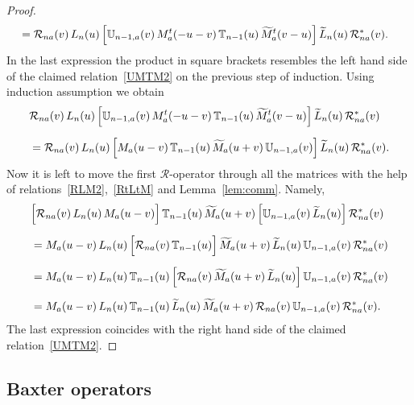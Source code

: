 \documentclass[11pt]{article}
\numberwithin{equation}{section}
\theoremstyle{plain}
\theoremstyle{definition}
\newcommand{\T}{\mathbb{T}}
\newcommand{\MMO}{\mathbb{U}}
\begin{document}
\begin{proof}
\begin{align}
\begin{aligned}
			& = \mathcal{R}_{na}(v) \,  L_n(u) \, \Bigl[ \MMO_{n - 1 , a}(v) \, M_a^t(- u - v) \, \T_{n - 1}(u) \, \widetilde{M}^t_a(v - u) \Bigr]  \, \widetilde{L}_n(u) \,  \mathcal{R}^*_{na}(v).
		\end{aligned}
	\end{align}
	In the last expression the product in square brackets resembles the left hand side of the claimed relation~\eqref{UMTM2} on the previous step of induction. Using induction assumption we obtain
	\begin{align}
		\begin{aligned}
			& \mathcal{R}_{na}(v) \,  L_n(u) \, \Bigl[ \MMO_{n - 1 , a}(v) \, M_a^t(- u - v) \, \T_{n - 1}(u) \, \widetilde{M}^t_a(v - u) \Bigr]  \, \widetilde{L}_n(u) \,  \mathcal{R}^*_{na}(v) \\[6pt]
			& = \mathcal{R}_{na}(v) \,  L_n(u) \, \Bigl[ M_a(u - v) \, \T_{n - 1}(u) \, \widetilde{M}_a(u + v) \, \MMO_{n - 1 , a}(v)  \Bigr]  \, \widetilde{L}_n(u) \,  \mathcal{R}^*_{na}(v).
		\end{aligned}
	\end{align}
	Now it is left to move the first $\mathcal{R}$-operator through all the matrices with the help of relations~\eqref{RLM2},~\eqref{RtLtM} and Lemma~\ref{lem:comm}. Namely,
	\begin{align}
		\begin{aligned}
			& \Bigl[ \mathcal{R}_{na}(v) \,  L_n(u) \, M_a(u - v)  \Bigr] \, \T_{n - 1}(u) \, \widetilde{M}_a(u + v) \, \Bigr[ \MMO_{n - 1 , a}(v)   \, \widetilde{L}_n(u)  \Bigr] \,  \mathcal{R}^*_{na}(v) \\[6pt]
			& = M_a(u - v)  \,  L_n(u) \, \Bigl[ \mathcal{R}_{na}(v) \, \T_{n - 1}(u) \Bigr] \, \widetilde{M}_a(u + v)  \, \widetilde{L}_n(u) \,  \MMO_{n - 1 , a}(v)   \,  \mathcal{R}^*_{na}(v) \\[6pt]
			& = M_a(u - v)  \,  L_n(u) \,  \T_{n - 1}(u) \, \Bigl[ \mathcal{R}_{na}(v) \, \widetilde{M}_a(u + v)  \, \widetilde{L}_n(u) \Bigr] \,  \MMO_{n - 1 , a}(v)   \,  \mathcal{R}^*_{na}(v) \\[6pt]
			& = M_a(u - v)  \,  L_n(u) \,  \T_{n - 1}(u) \, \widetilde{L}_n(u) \,  \widetilde{M}_a(u + v)  \, \mathcal{R}_{na}(v) \, \MMO_{n - 1 , a}(v)   \,  \mathcal{R}^*_{na}(v).
		\end{aligned}
	\end{align}
	The last expression coincides with the right hand side of the claimed relation~\eqref{UMTM2}.
\end{proof}

\subsection{Baxter operators} \label{sec:Qspace}
\end{document}
